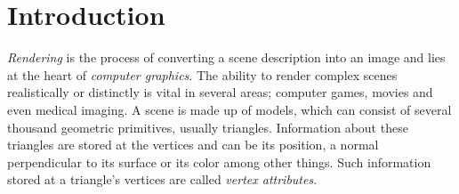 


\chapter{Introduction}




\textit{Rendering} is the process of converting a scene description into an
image and lies at the heart of \textit{computer graphics}. The ability to render
complex scenes realistically or distinctly is vital in several areas; computer
games, movies and even medical imaging. A scene is made up of models, which can
consist of several thousand geometric primitives, usually triangles. Information
about these triangles are stored at the vertices and can be its position, a
normal perpendicular to its surface or its color among other things. Such
information stored at a triangle's vertices are called \textit{vertex
  attributes}.


